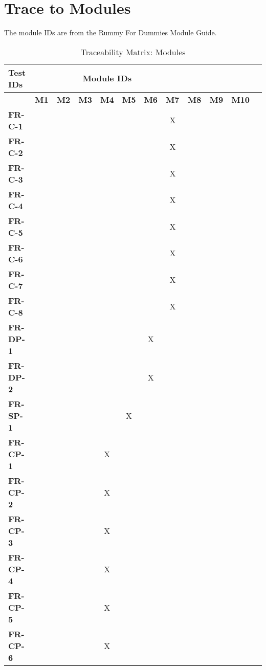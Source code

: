 \documentclass[12pt, titlepage]{article}
\begin{document}
\section{Trace to Modules}
The module IDs are from the Rummy For Dummies Module Guide.
\begin{table}[H]
    \centering
    \caption{Traceability Matrix: Modules}
    \begin{adjustbox}{max width=0.7\paperwidth}
    \begin{tabular}{l|ccccccccccc}
        \textbf{Test IDs} & \multicolumn{7}{c}{\textbf{Module IDs}}\\
        \hline
        ~ & \textbf{M1} & \textbf{M2} & \textbf{M3} & \textbf{M4} & \textbf{M5} & \textbf{M6} & \textbf{M7} & \textbf{M8} & \textbf{M9} & \textbf{M10}\\
        \textbf{FR-C-1}    & ~ & ~ & ~ & ~ & ~ & ~ & X & ~ & ~ & ~\\
        \textbf{FR-C-2}    & ~ & ~ & ~ & ~ & ~ & ~ & X & ~ & ~ & ~\\
        \textbf{FR-C-3}    & ~ & ~ & ~ & ~ & ~ & ~ & X & ~ & ~ & ~\\
        \textbf{FR-C-4}    & ~ & ~ & ~ & ~ & ~ & ~ & X & ~ & ~ & ~\\
        \textbf{FR-C-5}    & ~ & ~ & ~ & ~ & ~ & ~ & X & ~ & ~ & ~\\
        \textbf{FR-C-6}    & ~ & ~ & ~ & ~ & ~ & ~ & X & ~ & ~ & ~\\
        \textbf{FR-C-7}    & ~ & ~ & ~ & ~ & ~ & ~ & X & ~ & ~ & ~\\
        \textbf{FR-C-8}    & ~ & ~ & ~ & ~ & ~ & ~ & X & ~ & ~ & ~\\
        \textbf{FR-DP-1}   & ~ & ~ & ~ & ~ & ~ & X & ~ & ~ & ~ & ~\\
        \textbf{FR-DP-2}   & ~ & ~ & ~ & ~ & ~ & X & ~ & ~ & ~ & ~\\
        \textbf{FR-SP-1}   & ~ & ~ & ~ & ~ & X & ~ & ~ & ~ & ~ & ~\\
        \textbf{FR-CP-1}   & ~ & ~ & ~ & X & ~ & ~ & ~ & ~ & ~ & ~\\
        \textbf{FR-CP-2}   & ~ & ~ & ~ & X & ~ & ~ & ~ & ~ & ~ & ~\\
        \textbf{FR-CP-3}   & ~ & ~ & ~ & X & ~ & ~ & ~ & ~ & ~ & ~\\
        \textbf{FR-CP-4}   & ~ & ~ & ~ & X & ~ & ~ & ~ & ~ & ~ & ~\\
        \textbf{FR-CP-5}   & ~ & ~ & ~ & X & ~ & ~ & ~ & ~ & ~ & ~\\
        \textbf{FR-CP-6}   & ~ & ~ & ~ & X & ~ & ~ & ~ & ~ & ~ & ~\\

\end{tabular}
\end{adjustbox}
\end{table}
\end{document}

